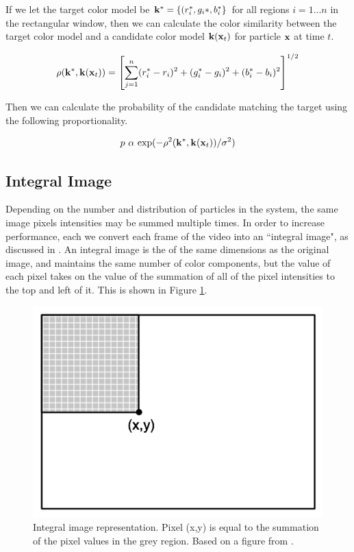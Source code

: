 \documentclass[11pt]{article}
\begin{document}
If we let the target color model be ${\bf k}^* = \{ (r_i^*, g_i*, b_i^* \}$ for all regions $i = 1 \dots n$ in the rectangular window, then we can calculate the color similarity between the target color model and a candidate color model ${\bf k}({\bf x}_t)$ for particle ${\bf x}$ at time $t$.

\begin{equation}
\rho({\bf k}^*, {\bf k}({\bf x}_t)) = \left [ \sum^n_{j = 1} (r_i^* - r_i)^2 + (g_i^* - g_i)^2 + (b_i^* - b_i)^2 \right ] ^{1/2}
\label{eq:colorsimilarity}
\end{equation}

Then we can calculate the probability of the candidate matching the target using the following proportionality.

\begin{equation}
p \text{ $\alpha$ exp} (-\rho^2({\bf k}^*, {\bf k}({\bf x}_t)) / \sigma^2)
\label{eq:colorprob}
\end{equation}


\subsection{Integral Image}

Depending on the number and distribution of particles in the system, the same image pixels intensities may be summed multiple times. In order to increase performance, each we convert each frame of the video into an ``integral image", as discussed in \cite{facedetection}. An integral image is the of the same dimensions as the original image, and maintains the same number of color components, but the value of each pixel takes on the value of the summation of all of the pixel intensities to the top and left of it. This is shown in Figure \ref{fig:integralimg}.
 
 \begin{figure}[H]
\centering
\includegraphics[scale=.4]{img/IntegralImage.jpg}
\caption{Integral image representation. Pixel (x,y) is equal to the summation of the pixel values in the grey region. Based on a figure from \cite{facedetection}.}
\label{fig:integralimg}
\end{figure}
\end{document}
